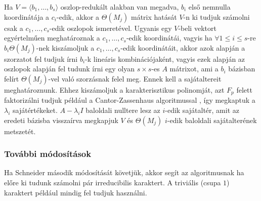 Ha $V=\langle b_1, \dots, b_s \rangle$ oszlop-redukált alakban van megadva, $b_i$ első nemnulla koordinátája a $c_i$-edik,
akkor a $\Theta(M_j)$ mátrix hatását $V$-n ki tudjuk számolni csak a $c_1, \dots, c_s$-edik oszlopok ismeretével.
Ugyanis egy $V$-beli vektort egyértelműen meghatároznak a $c_1, \dots, c_s$-edik koordinátái, vagyis ha $\forall 1\le i\le s$-re $b_i\Theta(M_j)$-nek kiszámoljuk a $c_1, \dots, c_s$-edik koordinátáit,
akkor azok alapján a szorzatot fel tudjuk írni $b_i$-k lineáris kombinációjaként, vagyis ezek alapján az oszlopok alapján fel tudunk írni egy olyan $s\times s$-es $A$ mátrixot,
ami a $b_i$ bázisban felírt $\Theta(M_j)$-vel való szorzásnak felel meg.
Ennek kell a sajátaltereit meghatároznunk.
Ehhez kiszámoljuk a karakterisztikus polinomját, azt $F_p$ felett faktorizálni tudjuk például a Cantor-Zassenhaus algoritmussal \cite{CZ81}, így megkaptuk a $\lambda_i$ sajátértékeket.
$A-\lambda_i I$ baloldali nulltere lesz az $i$-edik sajátaltér, amit az eredeti bázisba visszaírva megkapjuk $V$ és $\Theta(M_j)$ $i$-edik baloldali sajátalterének metszetét.

\subsubsection{További módosítások}
\label{subsubsec:bdstovabbi}
Ha Schneider második módosítását követjük, akkor segít az algoritmusnak ha előre ki tudunk számolni pár irreducibilis karaktert.
A triviális (csupa $1$) karaktert például mindig fel tudjuk használni.
